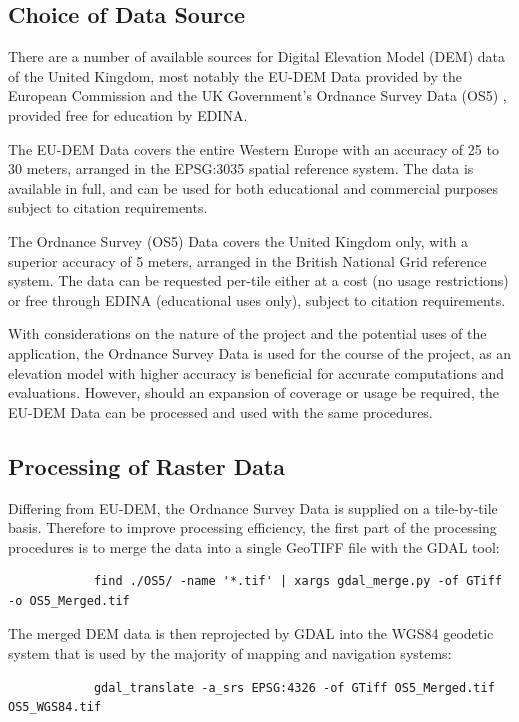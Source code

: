\documentclass[11pt, oneside]{article}
\begin{document}
	\subsection{Choice of Data Source}
		There are a number of available sources for Digital Elevation Model (DEM) data of the United Kingdom, most notably the EU-DEM Data \cite{eu-dem} provided by the European Commission and the UK Government's Ordnance Survey Data (OS5) \cite{os-5}, provided free for education by EDINA. 
		
		The EU-DEM Data covers the entire Western Europe with an accuracy of 25 to 30 meters, arranged in the EPSG:3035 \cite{epsg-3035} spatial reference system. The data is available in full, and can be used for both educational and commercial purposes subject to citation requirements. 
		
		The Ordnance Survey (OS5) Data covers the United Kingdom only, with a superior accuracy of 5 meters, arranged in the British National Grid \cite{osgb-1936} reference system. The data can be requested per-tile either at a cost (no usage restrictions) or free through EDINA (educational uses only), subject to citation requirements.
		
		With considerations on the nature of the project and the potential uses of the application, the Ordnance Survey Data is used for the course of the project, as an elevation model with higher accuracy is beneficial for accurate computations and evaluations. However, should an expansion of coverage or usage be required, the EU-DEM Data can be processed and used with the same procedures.
		
	\subsection{Processing of Raster Data} \label{subsec:rasterdata}
		Differing from EU-DEM, the Ordnance Survey Data is supplied on a tile-by-tile basis. Therefore to improve processing efficiency, the first part of the processing procedures is to merge the data into a single GeoTIFF \cite{geotiff} file with the GDAL tool:
		\begin{verbatim}
			find ./OS5/ -name '*.tif' | xargs gdal_merge.py -of GTiff -o OS5_Merged.tif 
		\end{verbatim}
		
		The merged DEM data is then reprojected by GDAL into the WGS84 geodetic system \cite{wgs84} that is used by the majority of mapping and navigation systems:
		\begin{verbatim}
			gdal_translate -a_srs EPSG:4326 -of GTiff OS5_Merged.tif OS5_WGS84.tif
		\end{verbatim}
		
\end{document}
